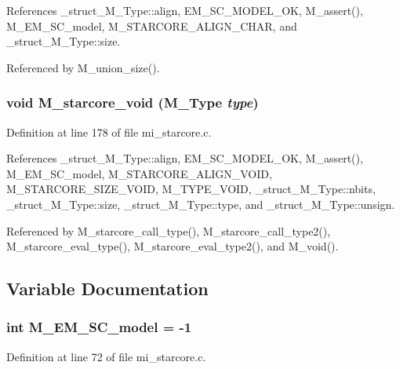 References \_\-struct\_\-M\_\-Type::align, EM\_\-SC\_\-MODEL\_\-OK, M\_\-assert(), M\_\-EM\_\-SC\_\-model, M\_\-STARCORE\_\-ALIGN\_\-CHAR, and \_\-struct\_\-M\_\-Type::size.

Referenced by M\_\-union\_\-size().
\subsubsection{\setlength{\rightskip}{0pt plus 5cm}void M\_\-starcore\_\-void (\bf{M\_\-Type} {\em type})}\label{mi__starcore_8c_5f5f744afe38121c2fac26ff804bd199}




Definition at line 178 of file mi\_\-starcore.c.

References \_\-struct\_\-M\_\-Type::align, EM\_\-SC\_\-MODEL\_\-OK, M\_\-assert(), M\_\-EM\_\-SC\_\-model, M\_\-STARCORE\_\-ALIGN\_\-VOID, M\_\-STARCORE\_\-SIZE\_\-VOID, M\_\-TYPE\_\-VOID, \_\-struct\_\-M\_\-Type::nbits, \_\-struct\_\-M\_\-Type::size, \_\-struct\_\-M\_\-Type::type, and \_\-struct\_\-M\_\-Type::unsign.

Referenced by M\_\-starcore\_\-call\_\-type(), M\_\-starcore\_\-call\_\-type2(), M\_\-starcore\_\-eval\_\-type(), M\_\-starcore\_\-eval\_\-type2(), and M\_\-void().

\subsection{Variable Documentation}
\subsubsection{\setlength{\rightskip}{0pt plus 5cm}int \bf{M\_\-EM\_\-SC\_\-model} = -1}\label{mi__starcore_8c_f27aeebffb573dd84524682cb99247cc}




Definition at line 72 of file mi\_\-starcore.c.

